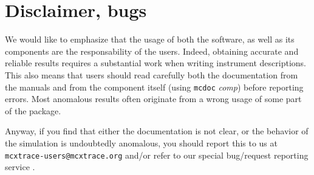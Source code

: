 \section{Disclaimer, bugs}

We would like to emphasize that the usage of both the \MCX software, as well as
its components are the responsability of the users. Indeed, obtaining accurate
and reliable results requires a substantial work when writing instrument
descriptions. This also means that users should read carefully both the
documentation from the manuals \cite{mcxtracemanual} and from the component
itself (using \verb+mcdoc+ \textit{comp}) before reporting errors. Most
anomalous results often originate from a wrong usage of some part of the
package.

Anyway, if you find that either the documentation is not clear, or the behavior
of the simulation is undoubtedly anomalous, you should report this to us at
\verb+mcxtrace-users@mcxtrace.org+ and/or refer to our special bug/request reporting service
\cite{mczilla_webpage}.
